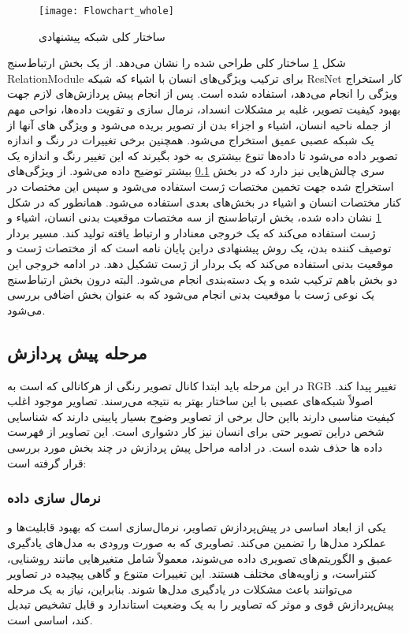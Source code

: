 \begin{figure}[ht]
	\centerline{\texttt{[image: Flowchart\_whole]}}
	\caption{ساختار کلی شبکه پیشنهادی
	}
	\label{fig:Flowchart_whole}
\end{figure}
شکل %
\ref{fig:Flowchart_whole}
ساختار کلی طراحی شده را نشان می‌دهد. از یک بخش ارتباط‌سنج %
\gls{RelationModule}
برای ترکیب ویژگی‌های انسان با اشیاء که شبکه ResNet کار استخراج ویژگی را انجام می‌دهد،‌ استفاده شده است. 
پس از انجام پیش‌ پردازش‌های لازم جهت بهبود کیفیت تصویر، غلبه بر مشکلات انسداد، نرمال سازی و تقویت داده‌ها، نواحی مهم از جمله ناحیه انسان، اشیاء و اجزاء بدن از تصویر بریده می‌شود و ویژگی های آنها از یک شبکه عصبی عمیق استخراج می‌شود. همچنین برخی تغییرات در رنگ و اندازه تصویر داده می‌شود تا داده‌ها تنوع بیشتری به خود بگیرند که این تغییر رنگ و اندازه یک سری چالش‌هایی نیز دارد که در بخش %
\ref{pishe_pishnehadi}
بیشتر توضیح داده می‌شود.
از ویژگی‌های استخراج شده جهت تخمین مختصات ژست استفاده می‌شود و سپس این مختصات در کنار مختصات انسان و اشیاء در بخش‌های بعدی استفاده می‌شود. همانطور که در شکل %
\ref{fig:Flowchart_whole}
نشان داده شده، بخش ارتباط‌سنج از سه مختصات موقعیت بدنی انسان، اشیاء و ژست استفاده می‌کند که یک خروجی معنادار و ارتباط‌ یافته تولید کند. مسیر بردار توصیف کننده بدن، یک روش پیشنهادی دراین پایان نامه است که از مختصات ژست و موقعیت بدنی استفاده می‌کند که یک بردار از ژست تشکیل دهد. در ادامه خروجی این دو بخش باهم ترکیب شده و یک دسته‌بندی انجام می‌شود.
البته درون بخش ارتباط‌سنج یک نوعی ژست با موقعیت بدنی ‌انجام می‌شود که به عنوان بخش اضافی بررسی می‌شود.

\subsection{مرحله پیش پردازش}\label{pishe_pishnehadi}

در این مرحله باید ابتدا کانال تصویر رنگی از هرکانالی که است به RGB تغییر پیدا کند. اصولاً شبکه‌های عصبی با این ساختار بهتر به نتیجه می‌رسند. تصاویر موجود اغلب کیفیت مناسبی دارند بااین حال برخی از تصاویر وضوح بسیار پایینی دارند که شناسایی شخص دراین تصویر حتی برای انسان نیز کار دشواری است. این تصاویر از فهرست داده ها حذف شده است.
در ادامه مراحل پیش پردازش در چند بخش مورد بررسی قرار گرفته است:
\subsubsection{نرمال سازی داده}

یکی از ابعاد اساسی در پیش‌پردازش تصاویر، نرمال‌سازی است که بهبود قابلیت‌ها و عملکرد مدل‌ها را تضمین می‌کند. تصاویری که به صورت ورودی به مدل‌های یادگیری عمیق و الگوریتم‌های تصویری داده می‌شوند، معمولاً شامل متغیرهایی مانند روشنایی، کنتراست، و زاویه‌های مختلف هستند. این تغییرات متنوع و گاهی پیچیده در تصاویر می‌توانند باعث مشکلات در یادگیری مدل‌ها شوند. بنابراین، نیاز به یک مرحله پیش‌پردازش قوی و موثر که تصاویر را به یک وضعیت استاندارد و قابل تشخیص تبدیل کند، اساسی است.

